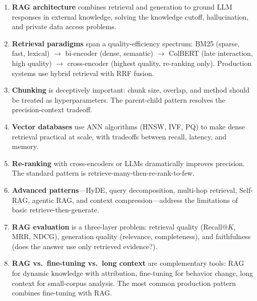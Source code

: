 \begin{enumerate}
    \item \textbf{RAG architecture} combines retrieval and generation to ground
          LLM responses in external knowledge, solving the knowledge cutoff,
          hallucination, and private data access problems.

    \item \textbf{Retrieval paradigms} span a quality-efficiency spectrum:
          BM25 (sparse, fast, lexical) $\to$ bi-encoder (dense, semantic) $\to$
          ColBERT (late interaction, high quality) $\to$ cross-encoder (highest
          quality, re-ranking only).  Production systems use hybrid retrieval
          with RRF fusion.

    \item \textbf{Chunking} is deceptively important: chunk size, overlap, and
          method should be treated as hyperparameters.  The parent-child
          pattern resolves the precision-context tradeoff.

    \item \textbf{Vector databases} use ANN algorithms (HNSW, IVF, PQ) to
          make dense retrieval practical at scale, with tradeoffs between
          recall, latency, and memory.

    \item \textbf{Re-ranking} with cross-encoders or LLMs dramatically improves
          precision.  The standard pattern is retrieve-many-then-re-rank-to-few.

    \item \textbf{Advanced patterns}---HyDE, query decomposition, multi-hop
          retrieval, Self-RAG, agentic RAG, and context compression---address
          the limitations of basic retrieve-then-generate.

    \item \textbf{RAG evaluation} is a three-layer problem: retrieval quality
          (Recall@$K$, MRR, NDCG), generation quality (relevance, completeness),
          and faithfulness (does the answer use only retrieved evidence?).

    \item \textbf{RAG vs.\ fine-tuning vs.\ long context} are complementary
          tools: RAG for dynamic knowledge with attribution, fine-tuning for
          behavior change, long context for small-corpus analysis.  The most
          common production pattern combines fine-tuning with RAG.
\end{enumerate}

